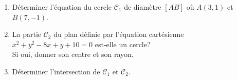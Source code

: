 \documentclass[a4paper, 11pt]{article}
\begin{document}
\begin{exercice}  \;
	\begin{enumerate}
		\item D\'eterminer l'\'equation du cercle $\mathcal{C}_1$ de diam\`etre $[AB]$ o\`u $A(3,1)$ et $B(7,-1)$.
		\item La partie $\mathcal{C}_2$ du plan d\'efinie par l'\'equation cart\'esienne $x^2+y^2-8x+y+10=0$ est-elle un cercle?\\
		      Si oui, donner son centre et son rayon.
		\item D\'eterminer l'intersection de $\mathcal{C}_1$ et $\mathcal{C}_2$.
	\end{enumerate}
\end{exercice}
\end{document}
